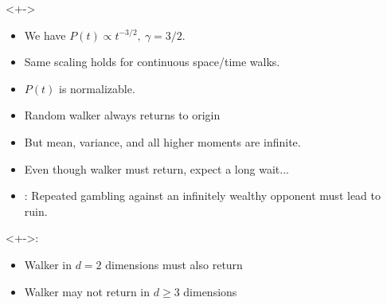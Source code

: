 \begin{frame}
  \small

  \begin{block}<+->{}
  \begin{itemize}
  \item<+->We have 
     $P(t) \propto t^{-3/2},\  \gamma = 3/2.$
  \item<+-> 
    Same scaling holds for continuous space/time walks.
  \item<+-> 
    $P(t)$ is normalizable.
  \item<+-> 
     Random walker always returns to origin 
  \item<+-> 
    But mean, variance, and all higher moments are infinite.
    \hfill {}
  \item<+-> 
    Even though walker must return, expect a long wait...
  \item<+-> 
    : 
    Repeated gambling against an infinitely wealthy opponent
    must lead to ruin.
  \end{itemize}
\end{block}

\begin{block}<+->{:}
  \begin{itemize}
  \item<+-> 
    Walker in $d=2$ dimensions must also return
  \item<+-> 
    Walker may not return in $d \ge 3$ dimensions
  \end{itemize}
  \end{block}

\end{frame}


